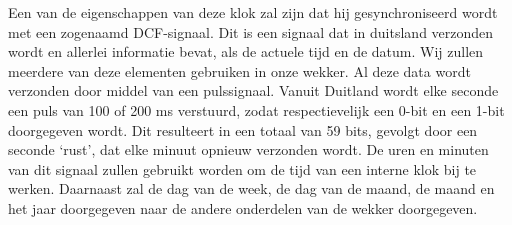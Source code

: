 Een van de eigenschappen van deze klok zal zijn dat hij gesynchroniseerd wordt met een zogenaamd DCF-signaal. Dit is een signaal dat in duitsland verzonden wordt en allerlei informatie bevat, als de actuele tijd en de datum. Wij zullen meerdere van deze elementen gebruiken in onze wekker.  Al deze data wordt verzonden door middel van een pulssignaal. Vanuit Duitland wordt elke seconde een puls van 100 of 200 ms verstuurd, zodat respectievelijk een 0-bit en een 1-bit doorgegeven wordt. Dit resulteert in een totaal van 59 bits, gevolgt door een seconde ‘rust’, dat elke minuut opnieuw verzonden wordt. De uren en minuten van dit signaal zullen gebruikt worden om de tijd van een interne klok bij te werken. Daarnaast zal de dag van de week, de dag van de maand, de maand en het jaar doorgegeven naar de andere onderdelen van de wekker doorgegeven.
